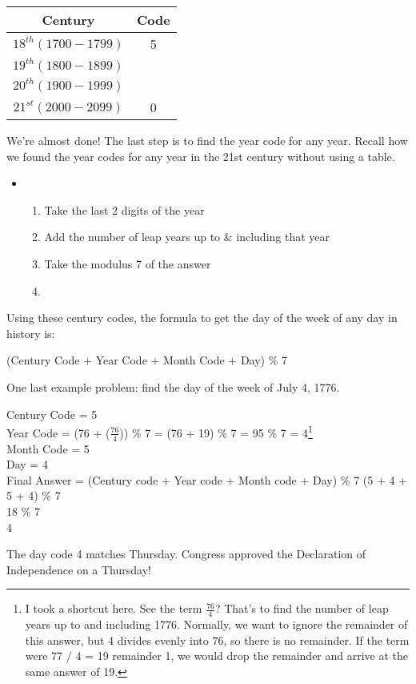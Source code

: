 \documentclass{article}
\begin{document}
  \begin{center}
  \end{center}

  \begin{center}
  \begin{tabular}{| c | c |}\hline
    Century & Code \\\hline\hline
    $18^{th} (1700-1799)$ & 5 \\\hline
    $19^{th} (1800-1899)$ &   \\\hline
    $20^{th} (1900-1999)$ &   \\\hline
    $21^{st} (2000-2099)$ & 0 \\\hline
  \end{tabular}
  \end{center}

\newpage

    We're almost done! The last step is to find the year code for any year. 
    Recall how we found the year codes for any year in the 21st century without using a table.
    \begin{itemize} \item[] \begin{enumerate}
      \item Take the last 2 digits of the year
      \item Add the number of leap years up to \& including that year
      \item Take the modulus 7 of the answer
      \item[]
    \end{enumerate} \end{itemize}
    Using these century codes, the formula to get the day of the week of any day in history is:
    \begin{center}
      (Century Code + Year Code + Month Code + Day) \% 7
    \end{center}

    One last example problem: find the day of the week of July 4, 1776.
    \begin{center}
      Century Code = 5\\
      Year Code = (76 + ($\frac{76}{4}$)) \% 7 = (76 + 19) \% 7 = 95 \% 7 = 4\footnote{I 
        took a shortcut here. See the term $\frac{76}{4}$? 
        That's to find the number of leap years up to and including 1776. 
        Normally, we want to ignore the remainder of this answer, but 4 divides evenly into 76,
        so there is no remainder. If the term were 77 / 4 = 19 remainder 1, 
        we would drop the remainder and arrive at the same answer of 19.}\\
      Month Code = 5\\
      Day = 4\\
    Final Answer = (Century code + Year code + Month code + Day) \% 7 (5 + 4 + 5 + 4) \% 7\\
    18 \% 7\\
    4\\
    \end{center}
    The day code 4 matches Thursday. 
    Congress approved the Declaration of Independence on a Thursday!
\end{document}
